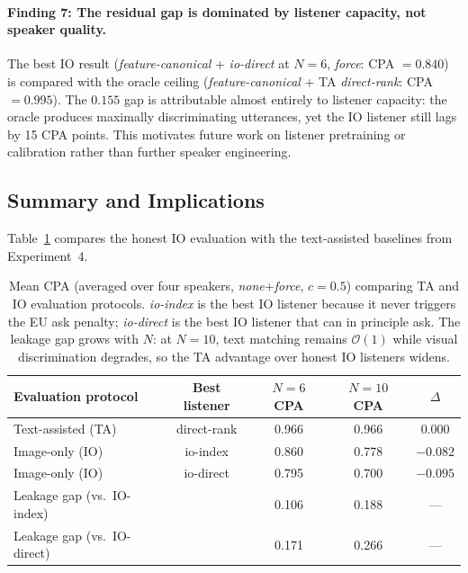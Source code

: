 \documentclass[11pt]{article}
\begin{document}
\paragraph{Finding 7: The residual gap is dominated by listener capacity, not speaker quality.}
The best IO result (\textit{feature-canonical} + \textit{io-direct} at $N{=}6$,
\textit{force}: CPA $= 0.840$) is compared with the oracle ceiling
(\textit{feature-canonical} + TA \textit{direct-rank}: CPA $= 0.995$).
The $0.155$ gap is attributable almost entirely to listener capacity:
the oracle produces maximally discriminating utterances, yet the IO listener
still lags by 15 CPA points.
This motivates future work on listener pretraining or calibration rather than
further speaker engineering.

\subsection{Summary and Implications}

Table~\ref{tab:io-summary} compares the honest IO evaluation with the
text-assisted baselines from Experiment~4.

\begin{table}[ht]
\centering
\small
\begin{tabular}{lcccc}
\toprule
Evaluation protocol & Best listener & $N{=}6$ CPA & $N{=}10$ CPA & $\Delta$ \\
\midrule
Text-assisted (TA)  & direct-rank  & 0.966 & 0.966 & 0.000 \\
Image-only (IO)     & io-index     & 0.860 & 0.778 & $-0.082$ \\
Image-only (IO)     & io-direct    & 0.795 & 0.700 & $-0.095$ \\
\midrule
Leakage gap (vs.\ IO-index) & & 0.106 & 0.188 & --- \\
Leakage gap (vs.\ IO-direct) & & 0.171 & 0.266 & --- \\
\bottomrule
\end{tabular}
\caption{Mean CPA (averaged over four speakers, \textit{none}+\textit{force},
         $c{=}0.5$) comparing TA and IO evaluation protocols.
         \textit{io-index} is the best IO listener because it never triggers
         the EU ask penalty; \textit{io-direct} is the best IO listener
         that can in principle ask.
         The leakage gap grows with $N$: at $N{=}10$, text matching remains
         $\mathcal{O}(1)$ while visual discrimination degrades, so the
         TA advantage over honest IO listeners widens.}
\label{tab:io-summary}
\end{table}
\end{document}
